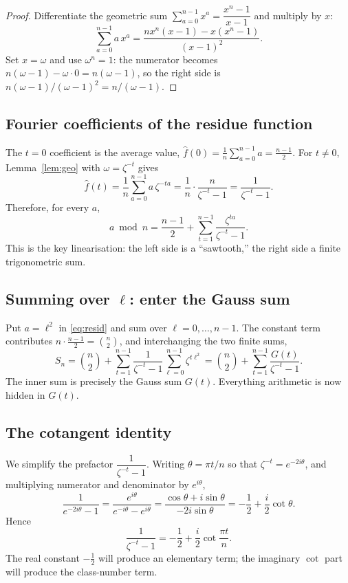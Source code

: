 \documentclass[11pt]{article}
\begin{document}
\begin{proof}
Differentiate the geometric sum $\sum_{a=0}^{n-1}x^a=\dfrac{x^n-1}{x-1}$ and multiply by $x$:
\[
\sum_{a=0}^{n-1}a\,x^{a}=\frac{n x^{n}(x-1)-x(x^{n}-1)}{(x-1)^2}.
\]
Set $x=\omega$ and use $\omega^n=1$: the numerator becomes $n(\omega-1)-\omega\cdot0=n(\omega-1)$, so the right
side is $n(\omega-1)/(\omega-1)^2=n/(\omega-1)$.
\end{proof}

\subsection{Fourier coefficients of the residue function}
The $t=0$ coefficient is the average value, $\hat f(0)=\frac1n\sum_{a=0}^{n-1}a=\frac{n-1}{2}$. For $t\ne0$,
Lemma~\ref{lem:geo} with $\omega=\zeta^{-t}$ gives
\[
\hat f(t)=\frac1n\sum_{a=0}^{n-1}a\,\zeta^{-ta}=\frac1n\cdot\frac{n}{\zeta^{-t}-1}=\frac{1}{\zeta^{-t}-1}.
\]
Therefore, for every $a$,
\begin{equation}\label{eq:resid}
a\bmod n=\frac{n-1}{2}+\sum_{t=1}^{n-1}\frac{\zeta^{ta}}{\zeta^{-t}-1}.
\end{equation}
This is the key linearisation: the left side is a ``sawtooth,'' the right side a finite trigonometric sum.

\subsection{Summing over $\ell$: enter the Gauss sum}
Put $a=\ell^2$ in \eqref{eq:resid} and sum over $\ell=0,\dots,n-1$. The constant term contributes
$n\cdot\frac{n-1}2=\binom n2$, and interchanging the two finite sums,
\begin{equation}\label{eq:S-gauss}
S_n=\binom n2+\sum_{t=1}^{n-1}\frac{1}{\zeta^{-t}-1}\sum_{\ell=0}^{n-1}\zeta^{t\ell^2}
=\binom n2+\sum_{t=1}^{n-1}\frac{G(t)}{\zeta^{-t}-1}.
\end{equation}
The inner sum is precisely the Gauss sum $G(t)$. Everything arithmetic is now hidden in $G(t)$.

\subsection{The cotangent identity}
We simplify the prefactor $\dfrac{1}{\zeta^{-t}-1}$. Writing $\theta=\pi t/n$ so that $\zeta^{-t}=e^{-2i\theta}$,
and multiplying numerator and denominator by $e^{i\theta}$,
\[
\frac{1}{e^{-2i\theta}-1}=\frac{e^{i\theta}}{e^{-i\theta}-e^{i\theta}}=\frac{\cos\theta+i\sin\theta}{-2i\sin\theta}
=-\frac12+\frac{i}{2}\cot\theta.
\]
Hence
\begin{equation}\label{eq:cot}
\frac{1}{\zeta^{-t}-1}=-\frac12+\frac{i}{2}\cot\frac{\pi t}{n}.
\end{equation}
The real constant $-\tfrac12$ will produce an elementary term; the imaginary $\cot$ part will produce the
class-number term.
\end{document}
